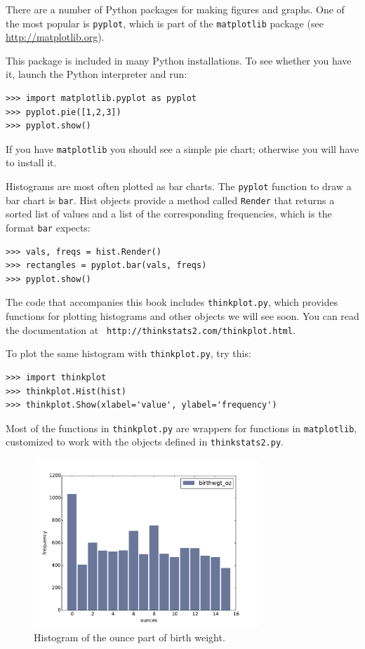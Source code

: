 \documentclass[12pt]{book}
\begin{document}
There are a number of Python packages for making figures and graphs.
One of the most popular is {\tt pyplot}, which is part of
the {\tt matplotlib} package (see \url{http://matplotlib.org}).

This package is included in many Python installations.  To see whether
you have it, launch the Python interpreter and run:
%
\begin{verbatim}
>>> import matplotlib.pyplot as pyplot
>>> pyplot.pie([1,2,3])
>>> pyplot.show()
\end{verbatim}

If you have {\tt matplotlib} you should see a simple pie chart;
otherwise you will have to install it.

Histograms are most often plotted as bar charts.  The
{\tt pyplot} function to draw a bar chart is {\tt bar}.  Hist
objects provide a method called {\tt Render} that returns a sorted
list of values and a list of the corresponding frequencies, which
is the format {\tt bar} expects:
%
\begin{verbatim}
>>> vals, freqs = hist.Render()
>>> rectangles = pyplot.bar(vals, freqs)
>>> pyplot.show()
\end{verbatim}

The code that accompanies this book includes {\tt thinkplot.py}, which
provides functions for plotting histograms and other objects we will
see soon.  You can read the documentation at {\tt
  http://thinkstats2.com/thinkplot.html}.  

To plot the same histogram with {\tt thinkplot.py}, try this:

\begin{verbatim}
>>> import thinkplot
>>> thinkplot.Hist(hist)
>>> thinkplot.Show(xlabel='value', ylabel='frequency')
\end{verbatim}

Most of the functions in {\tt thinkplot.py} are wrappers for
functions in {\tt matplotlib}, customized to work with
the objects defined in {\tt thinkstats2.py}.

\begin{figure}
\centerline{\includegraphics[height=2.5in]{figs/first_wgt_oz_hist.pdf}}
\caption{Histogram of the ounce part of birth weight.}
\label{first_wgt_oz_hist}
\end{figure}
\end{document}
